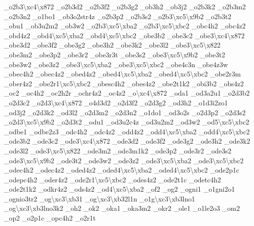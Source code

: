 \begin{DoxyCompactItemize}
\-\_\-o2b3\textbackslash{}xc4\textbackslash{}x872 \-\_\-o2b3d2 \-\_\-o2b3f2 \-\_\-o2b3g2 \-\_\-ob3h2 \-\_\-ob3j2 \-\_\-o2b3k2 \-\_\-o2b3m2 \-\_\-o2b3n2 \-\_\-o1bo1 \-\_\-ob3o2str4z \-\_\-o2b3p2 \-\_\-o2b3s2 \-\_\-o2b3\textbackslash{}xc5\textbackslash{}x9b2 \-\_\-o2b3t2 \-\_\-obu1 \-\_\-ob3u2m2 \-\_\-ob3w2 \-\_\-o2b3\textbackslash{}xc5\textbackslash{}xba2 \-\_\-o2b3\textbackslash{}xc5\textbackslash{}xbc2 \-\_\-obc4h2 \-\_\-obc4z2 \-\_\-obd4z2 \-\_\-obd4\textbackslash{}xc5\textbackslash{}xba2 \-\_\-obd4\textbackslash{}xc5\textbackslash{}xbc2 \-\_\-obe3b2 \-\_\-obe3c2 \-\_\-obe3\textbackslash{}xc4\textbackslash{}x872 \-\_\-obe3d2 \-\_\-obe3f2 \-\_\-obe3g2 \-\_\-obe3h2 \-\_\-obe3k2 \-\_\-obe3l2 \-\_\-obe3\textbackslash{}xc5\textbackslash{}x822 \-\_\-obe3m2 \-\_\-obe3p2 \-\_\-obe3r2 \-\_\-obe3r3t \-\_\-obe3s2 \-\_\-obe3\textbackslash{}xc5\textbackslash{}x9b2 \-\_\-obe3t2 \-\_\-obe3w2 \-\_\-obe3z2 \-\_\-obe3\textbackslash{}xc5\textbackslash{}xba2 \-\_\-obe3\textbackslash{}xc5\textbackslash{}xbc2 \-\_\-obe4c3n \-\_\-obe4z3w \-\_\-obec4h2 \-\_\-obec4z2 \-\_\-obed4z2 \-\_\-obed4\textbackslash{}xc5\textbackslash{}xba2 \-\_\-obed4\textbackslash{}xc5\textbackslash{}xbc2 \-\_\-obe2r3m \-\_\-ober4z2 \-\_\-obe2r1\textbackslash{}xc5\textbackslash{}xbc2 \-\_\-obesc4h2 \-\_\-obes4z2 \-\_\-obe2t1k2 \-\_\-obi3b2 \-\_\-obs4z2 \-\_\-oc2 \-\_\-oc4h2 \-\_\-oc2h2r \-\_\-ochr4z2 \-\_\-oc4z2 \-\_\-o\textbackslash{}xc4\textbackslash{}x872 \-\_\-oda1 \-\_\-od3a2u1 \-\_\-o2d3b2 \-\_\-o2d3c2 \-\_\-o2d3\textbackslash{}xc4\textbackslash{}x872 \-\_\-o4d3d2 \-\_\-o2d3f2 \-\_\-o2d3g2 \-\_\-od3h2 \-\_\-o1d3i2zo1 \-\_\-od3j2 \-\_\-o2d3k2 \-\_\-od3l2 \-\_\-o2d3m2 \-\_\-o2d3n2 \-\_\-o1do1 \-\_\-od3o2s \-\_\-o2d3p2 \-\_\-o2d3s2 \-\_\-o2d3\textbackslash{}xc5\textbackslash{}x9b2 \-\_\-o2d3t2 \-\_\-odu1 \-\_\-od3u2c4z \-\_\-od3u2m2 \-\_\-od3w2 \-\_\-od5\textbackslash{}xc5\textbackslash{}xbc2 \-\_\-odbe1 \-\_\-odbe2z3 \-\_\-odc4h2 \-\_\-odc4z2 \-\_\-odd4z2 \-\_\-odd4\textbackslash{}xc5\textbackslash{}xba2 \-\_\-odd4\textbackslash{}xc5\textbackslash{}xbc2 \-\_\-ode3b2 \-\_\-ode3c2 \-\_\-ode3\textbackslash{}xc4\textbackslash{}x872 \-\_\-ode3d2 \-\_\-ode3f2 \-\_\-ode3g2 \-\_\-ode3h2 \-\_\-ode3k2 \-\_\-ode3l2 \-\_\-ode3\textbackslash{}xc5\textbackslash{}x822 \-\_\-ode3m2 \-\_\-ode3m1k2 \-\_\-ode3p2 \-\_\-ode3r2 \-\_\-ode3s2 \-\_\-ode3\textbackslash{}xc5\textbackslash{}x9b2 \-\_\-ode3t2 \-\_\-ode3w2 \-\_\-ode3z2 \-\_\-ode3\textbackslash{}xc5\textbackslash{}xba2 \-\_\-ode3\textbackslash{}xc5\textbackslash{}xbc2 \-\_\-odec4h2 \-\_\-odec4z2 \-\_\-oded4z2 \-\_\-oded4\textbackslash{}xc5\textbackslash{}xba2 \-\_\-oded4\textbackslash{}xc5\textbackslash{}xbc2 \-\_\-ode2p1c \-\_\-odepc4h2 \-\_\-oder4z2 \-\_\-ode2r1\textbackslash{}xc5\textbackslash{}xbc2 \-\_\-odes4z2 \-\_\-ode2t1c \-\_\-odetc4h2 \-\_\-ode2t1k2 \-\_\-odkr4z2 \-\_\-ods4z2 \-\_\-od4\textbackslash{}xc5\textbackslash{}xba2 \-\_\-of2 \-\_\-og2 \-\_\-ogni1 \-\_\-o1gni2o1 \-\_\-ognio3tr2 \-\_\-og\textbackslash{}xc3\textbackslash{}xb31 \-\_\-og\textbackslash{}xc3\textbackslash{}xb32l1n \-\_\-o1g\textbackslash{}xc3\textbackslash{}xb3lno1 \-\_\-og\textbackslash{}xc3\textbackslash{}xb3lno3k2 \-\_\-oh2 \-\_\-ok2 \-\_\-oka1 \-\_\-oka3m2 \-\_\-okr2 \-\_\-ole1 \-\_\-o1le2o3 \-\_\-om2 \-\_\-op2 \-\_\-o2p1c \-\_\-opc4h2 \-\_\-o2r1t 
\end{DoxyCompactItemize}
